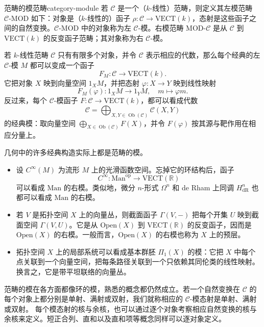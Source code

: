 \begin{definition}{范畴的模范畴}{category-module}
若 $\mathcal C$ 是一个（$k$-线性）范畴，则定义其左模范畴 $\mathcal C\text{-}\mathrm{MOD}$ 如下：对象是（$k$-线性的）函子 $\rho\colon\mathcal C\to\mathrm{VECT}(k)$，态射是这些函子之间的自然变换。$\mathcal C\text{-}\mathrm{MOD}$ 中的对象称为左 $\mathcal C$-模。右模范畴 $\mathrm{MOD}\text{-}\mathcal C$ 是从 $\mathcal C$ 到 $\mathrm{VECT}(k)$ 的反变函子范畴；其对象称为右 $\mathcal C$-模。
\end{definition}

\begin{example}[代数模与函子]\label{ex:modules-as-functors}
若 $k$-线性范畴 $\mathcal C$ 只有有限多个对象，并令 $\mathcal C$ 表示相应的代数，那么每个经典的左 $\mathcal C$-模 $M$ 都可以变成一个函子
\[
  F_M\colon\mathcal C\to\mathrm{VECT}(k).
\]
它把对象 $X$ 映到向量空间 $1_XM$，并把态射 $\varphi\colon X\to Y$ 映到线性映射
\[
  F_M(\varphi)\colon 1_XM\to1_YM,\quad m\longmapsto\varphi m.
\]
反过来，每个 $\mathcal C$-模函子 $F\colon\mathcal C\to\mathrm{VECT}(k)$，都可以看成代数
\[
  \mathcal C=\bigoplus_{X,Y\in\operatorname{Ob}(\mathcal C)}\mathcal C(X,Y)
\]
的经典模：取向量空间 $\bigoplus_{X\in\operatorname{Ob}(\mathcal C)}F(X)$，并令 $F(\varphi)$ 按其源与靶作用在相应分量上。
\end{example}

\begin{example}[几何中的范畴模]\label{ex:geometric-modules}
几何中的许多经典构造实际上都是范畴的模。
\begin{itemize}
  \item 设 $C^\infty(M)$ 为流形 $M$ 上的光滑函数空间。忘掉它的环结构后，函子
  \[
    C^\infty\colon\mathrm{Man}^{\mathrm{op}}\to\mathrm{VECT}(\mathbb R)
  \]
  可以看成 $\mathrm{Man}$ 的右模。类似地，微分 $n$-形式 $\Omega^n$ 和 de Rham 上同调 $H^n_{\mathrm{dR}}$ 也都可以看成 $\mathrm{Man}$ 的右模。
  \item 若 $V$ 是拓扑空间 $X$ 上的向量丛，则截面函子 $\Gamma(V,-)$ 把每个开集 $U$ 映到截面空间 $\Gamma(V,U)$。它是从 $\mathrm{Open}(X)$ 到 $\mathrm{VECT}(\mathbb R)$ 的反变函子，因而是 $\mathrm{Open}(X)$ 的右模。一般而言，$\mathrm{Open}(X)$ 的右模也称为 $X$ 上的预层。
  \item 拓扑空间 $X$ 上的局部系统可以看成基本群胚 $\Pi_1(X)$ 的模：它把 $X$ 中每个点关联到一个向量空间，把每条路径关联到一个只依赖其同伦类的线性映射。换言之，它是带平坦联络的向量丛。
\end{itemize}
范畴的模在各方面都像环的模，熟悉的概念都仍然成立。若一个自然变换在 $\mathcal C$ 的每个对象上都分别是单射、满射或双射，我们就称相应的 $\mathcal C$-模态射是单射、满射或双射。
每个模态射的核与余核，也可以通过逐个对象考察相应自然变换的核与余核来定义。短正合列、直和以及直和项等概念同样可以逐对象定义。
\end{example}

